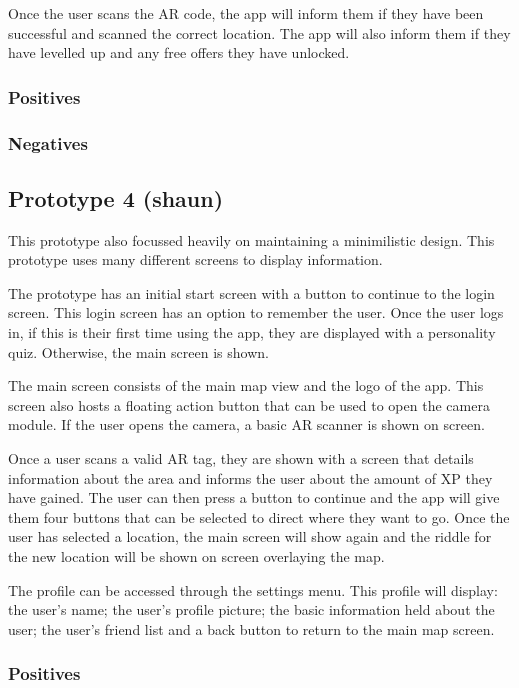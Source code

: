 \documentclass[a4,10pt,twocolumn]{article}
\begin{document}
Once the user scans the AR code, the app will inform them if they have been successful and scanned the correct location. The app will also inform them if they have levelled up and any free offers they have unlocked.



\subsubsection*{Positives}
\subsubsection*{Negatives}

\subsection*{Prototype 4 (shaun)}
This prototype also focussed heavily on maintaining a minimilistic design. This prototype uses many different screens to display information. 

The prototype has an initial start screen with a button to continue to the login screen. This login screen has an option to remember the user. Once the user logs in, if this is their first time using the app, they are displayed with a personality quiz. Otherwise, the main screen is shown.

The main screen consists of the main map view and the logo of the app. This screen also hosts a floating action button that can be used to open the camera module. If the user opens the camera, a basic AR scanner is shown on screen. 

Once a user scans a valid AR tag, they are shown with a screen that details information about the area and informs the user about the amount of XP they have gained. The user can then press a button to continue and the app will give them four buttons that can be selected to direct where they want to go. Once the user has selected a location, the main screen will show again and the riddle for the new location will be shown on screen overlaying the map.

The profile can be accessed through the settings menu. This profile will display: the user's name; the user's profile picture; the basic information held about the user; the user's friend list and a back button to return to the main map screen.

\subsubsection*{Positives}
\end{document}
